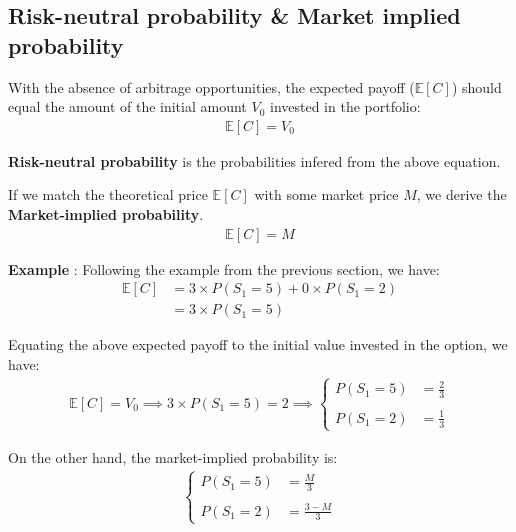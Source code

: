 \subsection{Risk-neutral probability \& Market implied probability}
\begin{definition}
    With the absence of arbitrage opportunities, the expected payoff ($\mathbb{E}[C]$) should equal the amount of the initial amount $V_0$ invested in the portfolio:
    \begin{align*}
        \mathbb{E}[C] = V_0
    \end{align*}

    \noindent\textbf{Risk-neutral probability} is the probabilities infered from the above equation.
\end{definition}

\begin{definition}
    If we match the theoretical price $\mathbb{E}[C]$ with some market price $M$, we derive the \textbf{Market-implied probability}.
    \begin{align*}
        \mathbb{E}[C] = M
    \end{align*}
\end{definition}

\textbf{Example} : Following the example from the previous section, we have:
\begin{align*}
    \mathbb{E}[C] &= 3 \times P(S_1 = 5) + 0 \times P(S_1 = 2) \\
        &= 3 \times P(S_1 = 5)
\end{align*}

\noindent Equating the above expected payoff to the initial value invested in the option, we have:
\begin{align*}
    \mathbb{E}[C] = V_0 \implies 3\times P(S_1 = 5) = 2 \implies 
    \begin{cases}
        P(S_1 = 5) &= \frac{2}{3} 
        \\ \\
        P(S_1 = 2) &= \frac{1}{3}
    \end{cases}
\end{align*}

\noindent On the other hand, the market-implied probability is:
\begin{align*}
    \begin{cases}
        P(S_1 = 5) &= \frac{M}{3} 
        \\ \\
        P(S_1 = 2) &= \frac{3 - M}{3}
    \end{cases}
\end{align*}
